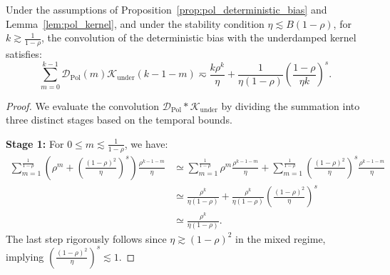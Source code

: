 \begin{lemma}
\label{lem:conv_under}
Under the assumptions of Proposition~\ref{prop:pol_deterministic_bias} and Lemma~\ref{lem:pol_kernel}, and under the stability condition
$\eta\lesssim B(1-\rho)$, for $k\gtrsim \frac{1}{1-\rho}$, the convolution of the deterministic bias with the underdamped kernel satisfies:
\begin{equation*}
    \sum_{m=0}^{k-1} \mathcal{D}_{\mathrm{Pol}}(m) \mathcal{K}_{\mathrm{under}}(k-1-m) 
    \eqsim 
    \frac{k\rho^k}{\eta} + \frac{1}{\eta(1-\rho)} \left(\frac{1-\rho}{\eta k}\right)^s.
\end{equation*}
\end{lemma}
\begin{proof}
We evaluate the convolution $\mathcal{D}_{\mathrm{Pol}} * \mathcal{K}_{\mathrm{under}}$ by dividing the summation into three distinct stages based on the temporal bounds.

\textbf{Stage 1:} For $0 \le m \lesssim \frac{1}{1-\rho}$, we have:
\begin{align*}
    \sum_{m=1}^{\frac{1}{1-\rho}} \left(\rho^m + \left(\frac{(1-\rho)^2}{\eta}\right)^s\right) \frac{\rho^{k-1-m}}{\eta}
    &\simeq \sum_{m=1}^{\frac{1}{1-\rho}} \rho^m \frac{\rho^{k-1-m}}{\eta} + \sum_{m=1}^{\frac{1}{1-\rho}} \left(\frac{(1-\rho)^2}{\eta}\right)^s \frac{\rho^{k-1-m}}{\eta} \\
    &\simeq \frac{\rho^k}{\eta(1-\rho)} + \frac{\rho^k}{\eta(1-\rho)} \left(\frac{(1-\rho)^2}{\eta}\right)^s \\
    &\simeq \frac{\rho^k}{\eta(1-\rho)}.
\end{align*}
The last step rigorously follows since $\eta \gtrsim (1-\rho)^2$ in the mixed regime, implying $\left(\frac{(1-\rho)^2}{\eta}\right)^s \lesssim 1$.


\end{proof}
